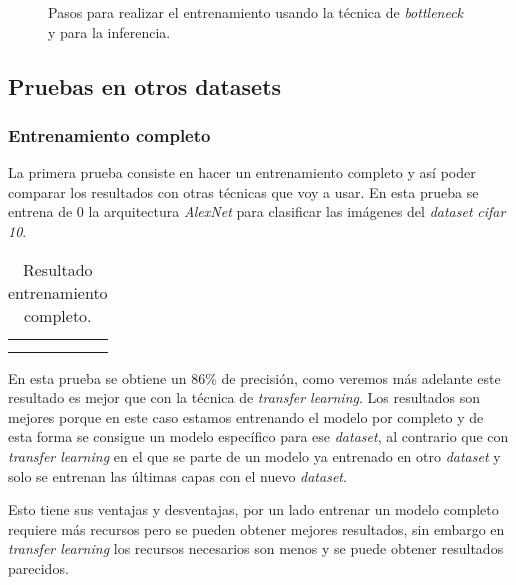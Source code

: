 \documentclass[12pt,a4paper]{article}
\begin{document}
\begin{figure}[H]
\centering
{}%
\qquad
{}%
\caption{Pasos para realizar el entrenamiento usando la técnica de \textit{bottleneck} y para la inferencia.}
\end{figure}

\subsection{Pruebas en otros datasets}
\subsubsection{Entrenamiento completo}
La primera prueba consiste en hacer un entrenamiento completo y así poder comparar los resultados con otras técnicas que voy a usar. En esta prueba se entrena de 0 la arquitectura \textit{AlexNet} para clasificar las imágenes del \textit{dataset} \textit{cifar 10}.
\begin{table}[H]
\centering
\begin{tabular}{|l|l|l|}
\hline
 &  &  \\ \hline
 &  &  \\ \hline
 &  &  \\ \hline
\end{tabular}
\caption{Resultado entrenamiento completo.}
\end{table}

En esta prueba se obtiene un 86\% de precisión, como veremos más adelante este resultado es mejor que con la técnica de \textit{transfer learning}. Los resultados son mejores porque en este caso estamos entrenando el modelo por completo y de esta forma se consigue un modelo específico para ese \textit{dataset}, al contrario que con \textit{transfer learning} en el que se parte de un modelo ya entrenado en otro \textit{dataset} y solo se entrenan las últimas capas con el nuevo \textit{dataset}.
\bigskip

Esto tiene sus ventajas y desventajas, por un lado entrenar un modelo completo requiere más recursos pero se pueden obtener mejores resultados, sin embargo en \textit{transfer learning} los recursos necesarios son menos y se puede obtener resultados parecidos.
\end{document}
